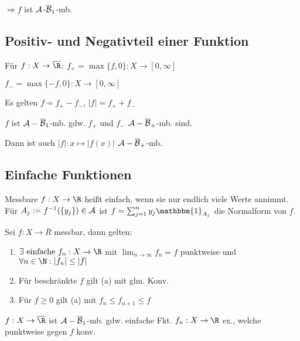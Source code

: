 $\Rightarrow f$ ist $\mathcal{A}$-$\overline {\mathcal{B}}_1$-mb.

\subsection*{Positiv- und Negativteil einer Funktion}

Für $f : X \to \overline \R$: $f_+ = \max\{f,0\} : X \to [0, \infty]$

\hspace{20.1mm} $f_- = \max\{-f,0\} : X \to [0, \infty]$

Es gelten $f = f_+ - f_-$, $|f| = f_+ + f_-$

$f$ ist $\mathcal{A}-\overline {\mathcal{B}}_1$-mb. gdw. $f_+$ und $f_-$ $\mathcal{A}-\overline {\mathcal{B}}_+$-mb. sind.

Dann ist auch $|f| : x \mapsto |f(x)|$ $\mathcal{A}-\overline {\mathcal{B}}_+$-mb.

\subsection*{Einfache Funktionen}

Messbare $f : X \to \R$ heißt einfach, wenn sie nur endlich viele Werte annimmt. Für $A_j := f^{-1}(\{y_j\}) \in \mathcal{A}$ ist $f = \sum_{j=1}^n y_j \mathbbm{1}_{A_j}$  die Normalform von $f$.

Sei $f : X \to \overline R$ messbar, dann gelten:

\begin{enumerate}[label=(\alph*)]
	\item $\exists \text{ einfache } f_n : X \to \R$ mit $\lim_{n \to \infty} f_n = f$ punktweise und $\forall n \in \N : |f_n| \leq |f|$
	\item Für beschränkte $f$ gilt (a) mit glm. Konv.
	\item Für $f \geq 0$ gilt (a) mit $f_n \leq f_{n+1} \leq f$
\end{enumerate}

$f : X \to \overline\R$ ist $\mathcal{A}-\overline{\mathcal{B}}_1$-mb. gdw. einfache Fkt. $f_n : X \to \R$ ex., welche punktweise gegen $f$ konv.
